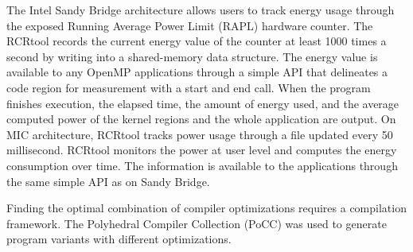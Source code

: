 The Intel Sandy Bridge architecture allows users to track energy usage through 
the exposed Running Average Power Limit (RAPL) hardware counter. 
The RCRtool records the current energy value of the counter at least 1000 times a second by writing 
into a shared-memory data structure. %
The energy value is available to any OpenMP applications through a simple API that 
delineates a code region for measurement with a start and end call.
When the program finishes execution,
the elapsed time, the amount of energy used, and the average computed
power of the kernel regions and the whole application are output. 
On MIC architecture, RCRtool tracks power usage through 
a file updated every 50 millisecond.
RCRtool monitors the power at user level and computes the energy
consumption over time. The information is available to the applications 
through the same simple API as on Sandy Bridge.

Finding the optimal combination of compiler optimizations 
requires a compilation framework.
The Polyhedral Compiler Collection (PoCC) was used to generate program 
variants with different optimizations. 
